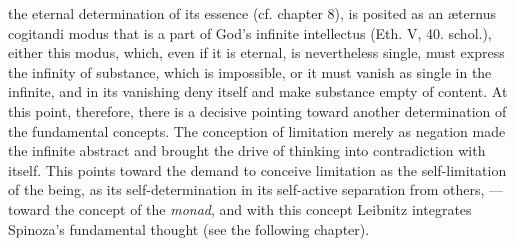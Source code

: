 \documentclass[12pt,a4paper,openany]{book}
\begin{document}
the eternal determination of its essence (cf. chapter 8), is posited as an
æternus cogitandi modus that is a part of God's infinite
intellectus (Eth. V, 40. schol.), either this modus,
which, even if it is eternal, is nevertheless single, must express the infinity
of substance, which is impossible, or it must vanish
as single in the infinite, and in its vanishing deny
itself and make substance empty of content. At this
point, therefore, there is a decisive pointing toward another determination
of the fundamental concepts. The conception of limitation
merely as negation made the infinite abstract and
brought the drive of thinking into contradiction with itself. This
points toward the demand to conceive limitation as
the self-limitation of the being, as its self-determination in
its self-active separation from others, --- toward the concept of the \emph{monad},
and with this concept Leibnitz integrates Spinoza's
fundamental thought (see the following chapter).
\end{document}
